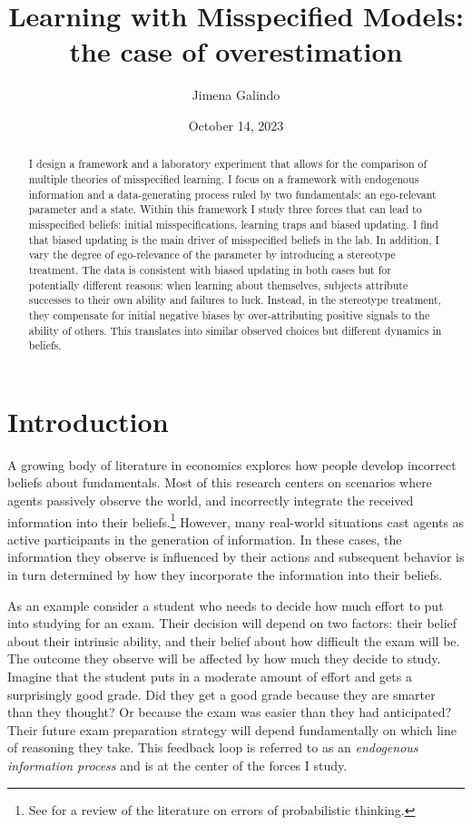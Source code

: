 \documentclass[
  12pt,
]{article}
\title{Learning with Misspecified Models: the case of overestimation}
\author{Jimena Galindo}
\date{October 14, 2023}
\begin{document}
\maketitle
\begin{abstract}
I design a framework and a laboratory experiment that allows for the
comparison of multiple theories of misspecified learning. I focus on a
framework with endogenous information and a data-generating process
ruled by two fundamentals: an ego-relevant parameter and a state. Within
this framework I study three forces that can lead to misspecified
beliefs: initial misspecifications, learning traps and biased updating.
I find that biased updating is the main driver of misspecified beliefs
in the lab. In addition, I vary the degree of ego-relevance of the
parameter by introducing a stereotype treatment. The data is consistent
with biased updating in both cases but for potentially different
reasons: when learning about themselves, subjects attribute successes to
their own ability and failures to luck. Instead, in the stereotype
treatment, they compensate for initial negative biases by
over-attributing positive signals to the ability of others. This
translates into similar observed choices but different dynamics in
beliefs.
\end{abstract}

\newpage

\hypertarget{introduction}{%
\section{Introduction}\label{introduction}}

A growing body of literature in economics explores how people develop
incorrect beliefs about fundamentals. Most of this research centers on
scenarios where agents passively observe the world, and incorrectly
integrate the received information into their
beliefs.\footnote{See \citet{benjamin2019} for a review of the literature on errors of 
probabilistic thinking.} However, many real-world situations cast agents
as active participants in the generation of information. In these cases,
the information they observe is influenced by their actions and
subsequent behavior is in turn determined by how they incorporate the
information into their beliefs.

As an example consider a student who needs to decide how much effort to
put into studying for an exam. Their decision will depend on two
factors: their belief about their intrinsic ability, and their belief
about how difficult the exam will be. The outcome they observe will be
affected by how much they decide to study. Imagine that the student puts
in a moderate amount of effort and gets a surprisingly good grade. Did
they get a good grade because they are smarter than they thought? Or
because the exam was easier than they had anticipated? Their future exam
preparation strategy will depend fundamentally on which line of
reasoning they take. This feedback loop is referred to as an
\emph{endogenous information 
process} and is at the center of the forces I study.
\end{document}
